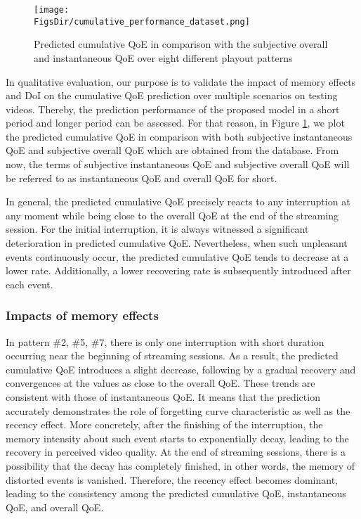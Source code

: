 \begin{figure}[tb]
  \centering
  \texttt{[image: \\FigsDir/cumulative\_performance\_dataset.png]}
  \caption{Predicted cumulative QoE in comparison with the subjective overall and instantaneous QoE over eight different playout patterns}
  \label{fig:Cumulative_Performance}
\end{figure}


In qualitative evaluation, our purpose is to validate the impact of memory effects and DoI on the cumulative QoE prediction over multiple scenarios on testing videos. Thereby, the prediction performance of the proposed model in a short period and longer period can be assessed. For that reason, in Figure \ref{fig:Cumulative_Performance}, we plot the predicted cumulative QoE in comparison with both subjective instantaneous QoE and subjective overall QoE which are obtained from the database. From now, the terms of subjective instantaneous QoE and subjective overall QoE will be referred to as instantaneous QoE and overall QoE for short. 

In general, the predicted cumulative QoE precisely reacts to any interruption at any moment while being close to the overall QoE at the end of the streaming session. For the initial interruption, it is always witnessed a significant deterioration in predicted cumulative QoE. Nevertheless, when such unpleasant events continuously occur, the predicted cumulative QoE tends to decrease at a lower rate. Additionally, a lower recovering rate is subsequently introduced after each event. 

\subsubsection{Impacts of memory effects}

  In pattern \#2, \#5, \#7, there is only one interruption with short duration occurring near the beginning of streaming sessions. As a result, the predicted cumulative QoE introduces a slight decrease, following by a gradual recovery and convergences at the values as close to the overall QoE. These trends are consistent with those of instantaneous QoE. It means that the prediction accurately demonstrates the role of forgetting curve characteristic as well as the recency effect. More concretely, after the finishing of the interruption, the memory intensity about such event starts to exponentially decay, leading to the recovery in perceived video quality. At the end of streaming sessions, there is a possibility that the decay has completely finished, in other words, the memory of distorted events is vanished. Therefore, the recency effect becomes dominant, leading to the consistency among the predicted cumulative QoE, instantaneous QoE, and overall QoE.
  
